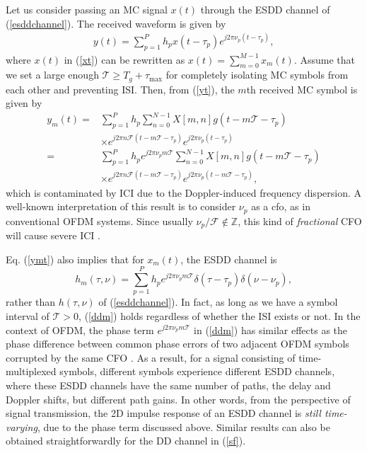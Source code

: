 \documentclass[journal]{IEEEtran}
\begin{document}
Let us consider passing an MC signal $x(t)$ through the ESDD channel of (\ref{esddchannel}). The received waveform is given by
\begin{align}\label{yt}
  y(t)=\sum_{p=1}^P h_p x(t-\tau_p)e^{j2\pi \nu_p (t-\tau_p)},
\end{align}
where $x(t)$ in (\ref{xt}) can be rewritten as
$x(t)=\sum_{m=0}^{M-1}x_m(t)$.
Assume that we set a large enough $\mathcal T\ge T_g+\tau_{\textrm{max}}$ for completely isolating MC symbols from each other and preventing ISI. Then, from (\ref{yt}), the $m$th received MC symbol is given by
\begin{align}\label{ymt}
  y_m(t) = & \sum_{p=1}^P h_p\sum_{n=0}^{N-1} X[m,n]g(t-m\mathcal T-\tau_p) \nonumber                              \\
           & \times e^{j2\pi n \mathcal F (t-m\mathcal T-\tau_p)}e^{j2\pi \nu_p (t-\tau_p)} \nonumber              \\
  =        & \sum_{p=1}^P h_p e^{j2\pi \nu_p m\mathcal T} \sum_{n=0}^{N-1} X[m,n]g(t-m\mathcal T-\tau_p) \nonumber \\
           & \times e^{j2\pi n \mathcal F (t-m\mathcal T-\tau_p)}e^{j2\pi \nu_p (t-m\mathcal T-\tau_p)},
\end{align}
which is contaminated by ICI due to the Doppler-induced frequency dispersion. A well-known interpretation of this result is to consider $\nu_p$ as a \ac{cfo}, {as in conventional OFDM systems}. {Since} usually $\nu_p/\mathcal F \not\in \mathbb Z$, this kind of \emph{fractional} CFO will cause severe ICI \cite{moose94}.

Eq. (\ref{ymt}) also implies that for $x_m(t)$, the ESDD channel is
\begin{equation}\label{ddm}
  h_m(\tau,\nu)=\sum_{p=1}^{P}h_p e^{j2\pi \nu_p m\mathcal T} \delta (\tau-\tau_p)\delta (\nu-\nu_p),
\end{equation}
rather than $h(\tau,\nu)$ of (\ref{esddchannel}). In fact, as long as we have a symbol interval of $\mathcal T >0$, (\ref{ddm}) holds regardless of whether the ISI exists or not. In the context of OFDM, the phase term
$e^{j2\pi \nu_p m\mathcal T}$ in (\ref{ddm}) {has similar effects} as the phase difference between common phase errors of two adjacent OFDM symbols corrupted by the same CFO \cite{moose94}.
As a result, for a signal consisting of time-multiplexed symbols, different symbols experience different ESDD channels, {where these ESDD channels have the same number of paths, the delay and Doppler shifts, but different path gains.}
In other words, from the perspective of signal transmission, the 2D impulse response of an ESDD channel is \emph{still time-varying}, due to the phase term discussed above. Similar results can also be obtained straightforwardly for the DD channel in (\ref{sf}).
\end{document}
